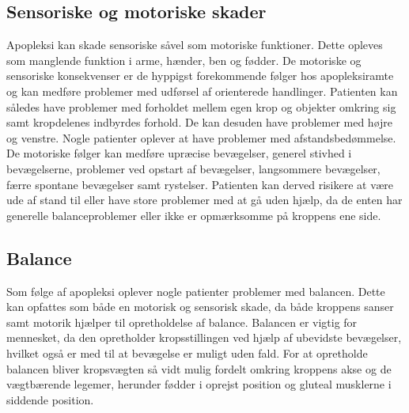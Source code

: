 \subsection{Sensoriske og motoriske skader} %
Apopleksi kan skade sensoriske såvel som motoriske funktioner. Dette opleves som manglende funktion i arme, hænder, ben og fødder. De motoriske og sensoriske konsekvenser er de hyppigst forekommende følger hos apopleksiramte og kan medføre problemer med udførsel af orienterede handlinger. Patienten kan således have problemer med forholdet mellem egen krop og objekter omkring sig samt kropdelenes indbyrdes forhold. De kan desuden have problemer med højre og venstre. Nogle patienter oplever at have problemer med afstandsbedømmelse. De motoriske følger kan medføre upræcise bevægelser, generel stivhed i bevægelserne, problemer ved opstart af bevægelser, langsommere bevægelser, færre spontane bevægelser samt rystelser. Patienten kan derved risikere at være ude af stand til eller have store problemer med at gå uden hjælp, da de enten har generelle balanceproblemer eller ikke er opmærksomme på kroppens ene side.\cite{Sundhed.dk,DSfA2009}

\subsection{Balance}
Som følge af apopleksi oplever nogle patienter problemer med balancen. Dette kan opfattes som både en motorisk og sensorisk skade, da både kroppens sanser samt motorik hjælper til opretholdelse af balance. Balancen er vigtig for mennesket, da den opretholder kropsstillingen ved hjælp af ubevidste bevægelser, hvilket også er med til at bevægelse er muligt uden fald. For at opretholde balancen bliver kropsvægten så vidt mulig fordelt omkring kroppens akse og de vægtbærende legemer, herunder fødder i oprejst position og gluteal musklerne i siddende position.\cite{Nichols1997}

